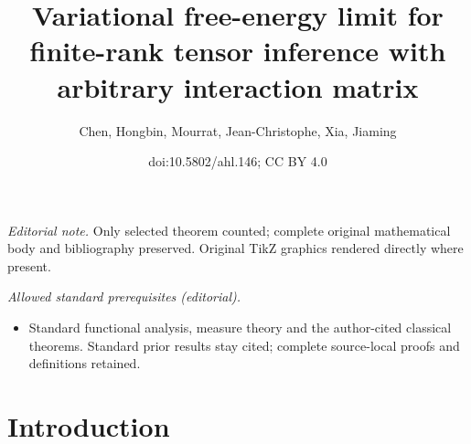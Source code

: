 \documentclass[10pt]{amsart}
\title{Variational free-energy limit for finite-rank tensor inference with arbitrary interaction matrix}
\author{Chen, Hongbin, Mourrat, Jean-Christophe, Xia, Jiaming}
\date{doi:10.5802/ahl.146; CC BY 4.0}
\theoremstyle{definition}\newtheorem{defi}[theo]{Definition}\newtheorem{rema}[theo]{Remark}\newtheorem{exam}[theo]{Example}\newtheorem{exem}[theo]{Example}\newtheorem{nota}[theo]{Notation}
\begin{document}
\maketitle
\noindent\textit{Editorial note.} Only selected theorem counted; complete original mathematical body and bibliography preserved. Original TikZ graphics rendered directly where present.\par\medskip
\noindent\textit{Allowed standard prerequisites (editorial).}\begin{itemize}
\item Standard functional analysis, measure theory and the author-cited classical theorems. Standard prior results stay cited; complete source-local proofs and definitions retained.
\end{itemize}\medskip

\section{Introduction}
\end{document}
